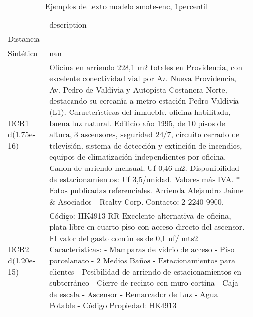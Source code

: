 \begin{table}[H]
\centering
\fontsize{10}{14}\selectfont
\caption{Ejemplos de texto modelo smote-enc, 1percentil}
\label{table-example-economicos-b-2-smote-enc-1p-text}
\begin{tabular}{|l|m{35em}|}
\hline
\rowcolor[gray]{0.8}
 & description \\
Distancia &  \\
\hline Sintético & nan \\
\hline DCR1 d(1.75e-16) & Oficina en arriendo 228,1 m2 totales en Providencia, con excelente conectividad vial por Av. Nueva Providencia, Av. Pedro de Valdivia y Autopista Costanera Norte, destacando su cercan{\'\i}a a metro estaci\'on Pedro Valdivia (L1).  Caracter{\'\i}sticas del inmueble: oficina habilitada, buena luz natural. Edificio a\~no 1995, de 10 pisos de altura, 3 ascensores, seguridad 24/7, circuito cerrado de televisi\'on, sistema de detecci\'on y extinci\'on de incendios, equipos de climatizaci\'on independientes por oficina.  Canon de arriendo mensual: Uf 0,46 m2. Disponibilidad de estacionamientos: Uf 3,5/unidad. Valores m\'as IVA.  * Fotos publicadas referenciales. Arrienda Alejandro Jaime \& Asociados - Realty Corp. Contacto: 2 2240 9900. \\
\hline DCR2 d(1.20e-15) & C\'odigo: HK4913 RR  Excelente alternativa de oficina, plata libre en cuarto piso con acceso directo del ascensor. El valor del gasto com\'un es de 0,1 uf/ mts2.  Caracter{\'\i}sticas: - Mamparas de vidrio de acceso - Piso porcelanato - 2 Medios Ba\~nos - Estacionamientos para clientes - Posibilidad de arriendo de estacionamientos en subterr\'aneo - Cierre de recinto con muro cortina - Caja de escala - Ascensor - Remarcador de Luz - Agua Potable - C\'odigo Propiedad: HK4913 \\
\hline
\end{tabular}
\end{table}
